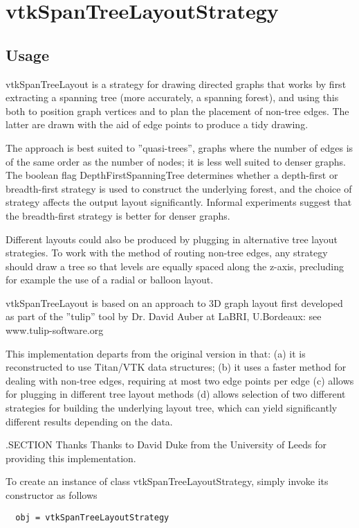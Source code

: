\section{vtkSpanTreeLayoutStrategy}

\subsection{Usage}

 vtkSpanTreeLayout is a strategy for drawing directed graphs that
 works by first extracting a spanning tree (more accurately, a 
 spanning forest), and using this both to position graph vertices
 and to plan the placement of non-tree edges.  The latter are drawn
 with the aid of edge points to produce a tidy drawing.

 The approach is best suited to ''quasi-trees'', graphs where the number
 of edges is of the same order as the number of nodes; it is less well
 suited to denser graphs.  The boolean flag DepthFirstSpanningTree
 determines whether a depth-first or breadth-first strategy is used to
 construct the underlying forest, and the choice of strategy affects
 the output layout significantly.  Informal experiments suggest that
 the breadth-first strategy is better for denser graphs.

 Different layouts could also be produced by plugging in alternative
 tree layout strategies.  To work with the method of routing non-tree
 edges, any strategy should draw a tree so that levels are equally
 spaced along the z-axis, precluding for example the use of a radial
 or balloon layout.

 vtkSpanTreeLayout is based on an approach to 3D graph layout first 
 developed as part of the ''tulip'' tool by Dr. David Auber at LaBRI, 
 U.Bordeaux: see www.tulip-software.org   

 This implementation departs from the original version in that:
 (a) it is reconstructed to use Titan/VTK data structures;
 (b) it uses a faster method for dealing with non-tree edges,
     requiring at most two edge points per edge
 (c) allows for plugging in different tree layout methods
 (d) allows selection of two different strategies for building
     the underlying layout tree, which can yield significantly
     different results depending on the data.

 .SECTION Thanks
 Thanks to David Duke from the University of Leeds for providing this 
 implementation.

To create an instance of class vtkSpanTreeLayoutStrategy, simply
invoke its constructor as follows
\begin{verbatim}
  obj = vtkSpanTreeLayoutStrategy
\end{verbatim}
